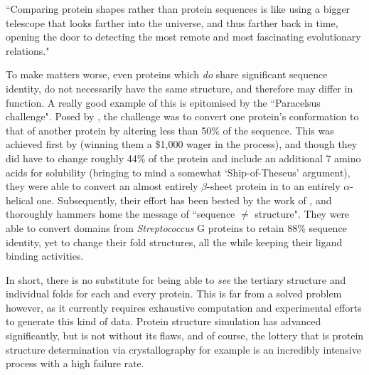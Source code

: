 \begin{displayquote}
``Comparing protein shapes rather than protein sequences is like using a bigger telescope that looks farther into the universe, and thus farther back in time, opening the door to detecting the most remote and most fascinating evolutionary relations."
\end{displayquote}

To make matters worse, even proteins which \emph{do} share significant sequence identity, do not necessarily have the same structure, and therefore may differ in function. A really good example of this is epitomised by the ``Paracelsus challenge". Posed by \cite{Rose1994}, the challenge was to convert one protein's conformation to that of another protein by altering less than 50\% of the sequence. This was achieved first by \cite{Dalal1997} (winning them a \$1,000 wager in the process), and though they did have to change roughly 44\% of the protein and include an additional 7 amino acids for solubility (bringing to mind a somewhat `Ship-of-Theseus' argument), they were able to convert an almost entirely $\beta$-sheet protein in to an entirely $\alpha$-helical one. Subsequently, their effort has been bested by the work of \cite{Alexander2007}, and thoroughly hammers home the message of ``sequence $\neq$ structure". They were able to convert domains from \emph{Streptococcus} G proteins to retain 88\% sequence identity, yet to change their fold structures, all the while keeping their ligand binding activities.

In short, there is no substitute for being able to \emph{see} the tertiary structure and individual folds for each and every protein. This is far from a solved problem however, as it currently requires exhaustive computation and experimental efforts to generate this kind of data. Protein structure simulation has advanced significantly, but is not without its flaws, and of course, the lottery that is protein structure determination via crystallography for example is an incredibly intensive process with a high failure rate. 


